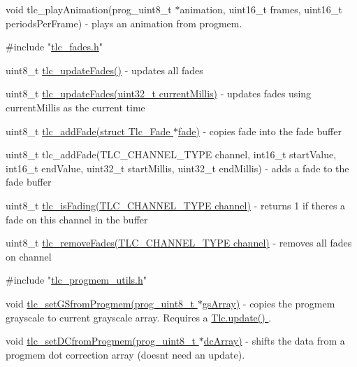 \begin{DoxyItemize}
\item void tlc\+\_\+play\+Animation(prog\+\_\+uint8\+\_\+t $\ast$animation, uint16\+\_\+t frames, uint16\+\_\+t periods\+Per\+Frame) -\/ plays an animation from progmem.
\end{DoxyItemize}


\begin{DoxyCode}
\textcolor{preprocessor}{#include "\hyperlink{tlc__fades_8h}{tlc\_fades.h}"} 
\end{DoxyCode}

\begin{DoxyItemize}
\item uint8\+\_\+t \hyperlink{group__ExtendedFunctions_ga48d61decbeb32b4b31c0e82097e69577}{tlc\+\_\+update\+Fades()} -\/ updates all fades
\item uint8\+\_\+t \hyperlink{group__ExtendedFunctions_gaa3da29446480ef76d5c2a26ef97b1884}{tlc\+\_\+update\+Fades(uint32\+\_\+t current\+Millis)} -\/ updates fades using current\+Millis as the current time
\item uint8\+\_\+t \hyperlink{group__ExtendedFunctions_ga5af78538816f1331f3d1977b6feaa2df}{tlc\+\_\+add\+Fade(struct Tlc\+\_\+\+Fade $\ast$fade)} -\/ copies fade into the fade buffer
\item uint8\+\_\+t tlc\+\_\+add\+Fade(T\+L\+C\+\_\+\+C\+H\+A\+N\+N\+E\+L\+\_\+\+T\+Y\+PE channel, int16\+\_\+t start\+Value, int16\+\_\+t end\+Value, uint32\+\_\+t start\+Millis, uint32\+\_\+t end\+Millis) -\/ adds a fade to the fade buffer
\item uint8\+\_\+t \hyperlink{group__ExtendedFunctions_ga3ba34d1e1519c8f742b364958bced96f}{tlc\+\_\+is\+Fading(\+T\+L\+C\+\_\+\+C\+H\+A\+N\+N\+E\+L\+\_\+\+T\+Y\+P\+E channel)} -\/ returns 1 if there\textquotesingle{}s a fade on this channel in the buffer
\item uint8\+\_\+t \hyperlink{group__ExtendedFunctions_ga262446811b33d3765bf9434bebb60cff}{tlc\+\_\+remove\+Fades(\+T\+L\+C\+\_\+\+C\+H\+A\+N\+N\+E\+L\+\_\+\+T\+Y\+P\+E channel)} -\/ removes all fades on channel
\end{DoxyItemize}


\begin{DoxyCode}
\textcolor{preprocessor}{#include "\hyperlink{tlc__progmem__utils_8h}{tlc\_progmem\_utils.h}"} 
\end{DoxyCode}

\begin{DoxyItemize}
\item void \hyperlink{group__ExtendedFunctions_gab61761323f7364b25d83c6e63711cd4b}{tlc\+\_\+set\+G\+Sfrom\+Progmem(prog\+\_\+uint8\+\_\+t $\ast$gs\+Array)} -\/ copies the progmem grayscale to current grayscale array. Requires a \hyperlink{group__CoreFunctions_ga18ee51310250855d75cff715a5ff4d48}{Tlc.\+update() }.
\item void \hyperlink{group__ReqVPRG__ENABLED_ga0ee9aa27ddfa975fba5b1dbba1cced25}{tlc\+\_\+set\+D\+Cfrom\+Progmem(prog\+\_\+uint8\+\_\+t $\ast$dc\+Array)} -\/ shifts the data from a progmem dot correction array (doesn\textquotesingle{}t need an update).
\end{DoxyItemize}


